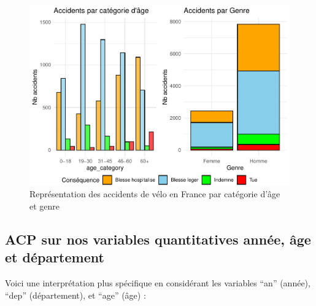 \documentclass[french,]{compterendu}
\theoremstyle{urcastyle}
\theoremstyle{remark}
\begin{document}
\begin{figure}[H]

{\centering \includegraphics[width=0.9\linewidth]{Rapport_ADD_LEO-GABET_files/figure-latex/accfranceComple-1} 

}

\caption{Représentation des accidents de vélo en France par catégorie d'âge et genre}\label{fig:accfranceComple}
\end{figure}

\hypertarget{acp-sur-nos-variables-quantitatives-annuxe9e-uxe2ge-et-duxe9partement}{%
\subsection{ACP sur nos variables quantitatives année, âge et département}\label{acp-sur-nos-variables-quantitatives-annuxe9e-uxe2ge-et-duxe9partement}}

Voici une interprétation plus spécifique en considérant les variables ``an'' (année), ``dep'' (département), et ``age'' (âge) :
\end{document}

